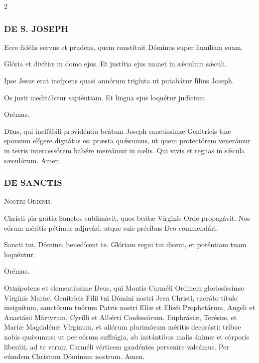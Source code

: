 \documentclass[9pt,twoside]{extarticle}
\begin{document}
\begin{multicols}{2}
\subsubsection*{\center \textsc{DE S. JOSEPH}}
\begin{tightlist}{}
\item {}
\item {} Ecce fidélis servus et prudens, quem constítuit Dóminus super famíliam suam.
\item {} Glória et divítiæ in domo ejus.  Et justítia ejus manet in sǽculum sǽculi.
\item {} Ipse Jesus erat incípiens quasi annórum trigínta ut putabátur fílius Joseph.
\item {} Os justi meditábitur sapiéntiam.  Et lingua ejus loquétur judícium.
\item Orémus. \hfill {}
\end{tightlist}
\lettrine{D}eus, qui ineffábili providéntia beátum Joseph sanctíssimæ Genitrícis tuæ sponsum elígere dignátus es: præsta quǽsumus, ut quem protectórem venerámur in terris intercessórem habére mereámur in cœlis. Qui vivis et regnas in sǽcula sæculórum. Amen.

\subsubsection*{\center \textsc{DE SANCTIS}}
\begin{center}\textsc{Nostri Ordinis.}\end{center}
\begin{tightlist}{}
\item {} Christi pia grátia Sanctos sublimávit, quos beátæ Vírginis Ordo propagávit. Nos eórum méritis pétimus adjuvári, atque suis précibus Deo commendári.
\item {} Sancti tui, Dómine, benedícent te.  Glóriam regni tui dicent, et poténtiam tuam loquéntur.
\item Orémus. \hfill {}
\end{tightlist}
\lettrine{O}mnípotens et clementíssime Deus, qui Montis Carméli Ordinem gloriosíssimæ Vírginis Maríæ, Genitrícis Fílii tui Dómini nostri Jesu Christi, sacráto título insignítum, sanctórum tuórum Patris nostri Elíæ et Eliséi Prophetárum, Angeli et Anastásii Mártyrum, Cyrílli et Albérti Confessórum, Euphrásiæ, Terésiæ, et Maríæ Magdalénæ Vírginum, et aliórum plurimórum méritis decorásti: tríbue nobis quǽsumus; ut per eórum suffrágia, ab instántibus malis ánimæ et córporis liberáti, ad te verum Carméli vérticem gaudéntes perveníre valeámus. Per eúmdem Christum Dóminum nostrum. Amen.


\end{multicols}
\end{document}
